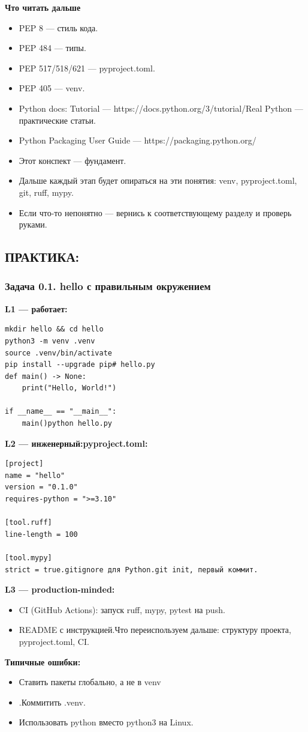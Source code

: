 \textbf{Что читать дальше}
\begin{itemize}
\item PEP 8 — стиль кода.
\item PEP 484 — типы.
\item PEP 517/518/621 — pyproject.toml.
\item PEP 405 — venv.
\item Python docs: Tutorial — https://docs.python.org/3/tutorial/Real Python — практические статьи.
\item Python Packaging User Guide — https://packaging.python.org/
\end{itemize}
\begin{warningbox2}
\begin{itemize}
\item Этот конспект — фундамент. 
\item Дальше каждый этап будет опираться на эти понятия: venv, pyproject.toml, git, ruff, mypy. 
\item Если что-то непонятно — вернись к соответствующему разделу и проверь руками.
\end{itemize}
\end{warningbox2}
\newpage
\subsection{ПРАКТИКА:}

\subsubsection{Задача 0.1. hello с правильным окружением}

\textbf{L1 — работает:}
\begin{lstlisting}
mkdir hello && cd hello
python3 -m venv .venv
source .venv/bin/activate
pip install --upgrade pip# hello.py
def main() -> None:
    print("Hello, World!")

if __name__ == "__main__":
    main()python hello.py
\end{lstlisting}

\textbf{L2 — инженерный:pyproject.toml:}
\begin{lstlisting}
[project]
name = "hello"
version = "0.1.0"
requires-python = ">=3.10"

[tool.ruff]
line-length = 100

[tool.mypy]
strict = true.gitignore для Python.git init, первый коммит.
\end{lstlisting}

\textbf{L3 — production-minded:}
\begin{itemize}
\item CI (GitHub Actions): запуск ruff, mypy, pytest на push.
\item README с инструкцией.Что переиспользуем дальше: структуру проекта, pyproject.toml, CI.
\end{itemize}

\textbf{Типичные ошибки:}
\begin{itemize}
\item Ставить пакеты глобально, а не в venv
\item .Коммитить .venv.
\item Использовать python вместо python3 на Linux.
\end{itemize}